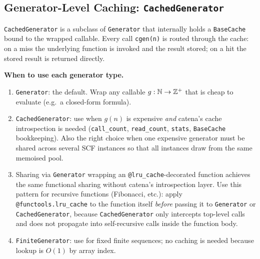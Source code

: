 \subsection{Generator-Level Caching: \texttt{CachedGenerator}}

\texttt{CachedGenerator} is a subclass of \texttt{Generator} that internally
holds a \texttt{BaseCache} bound to the wrapped callable.  Every call
\texttt{cgen(n)} is routed through the cache: on a miss the underlying function
is invoked and the result stored; on a hit the stored result is returned directly.

\textbf{When to use each generator type.}
\begin{enumerate}
  \item \texttt{Generator}: the default.  Wrap any callable $g: \mathbb{N} \to \mathbb{Z}^+$
        that is cheap to evaluate (e.g.\ a closed-form formula).
  \item \texttt{CachedGenerator}: use when $g(n)$ is expensive \emph{and}
        catena's cache introspection is needed (\texttt{call\_count},
        \texttt{read\_count}, \texttt{stats}, \texttt{BaseCache}
        bookkeeping).  Also the right choice when one expensive generator
        must be shared across several SCF instances so that all instances
        draw from the same memoised pool.
  \item Sharing via \texttt{Generator} wrapping an \texttt{@lru\_cache}-decorated
        function achieves the same functional sharing without catena's
        introspection layer.  Use this pattern for recursive functions
        (Fibonacci, etc.): apply \texttt{@functools.lru\_cache} to the function
        itself \emph{before} passing it to \texttt{Generator} or
        \texttt{CachedGenerator}, because \texttt{CachedGenerator} only
        intercepts top-level calls and does not propagate into self-recursive
        calls inside the function body.
  \item \texttt{FiniteGenerator}: use for fixed finite sequences; no caching
        is needed because lookup is $O(1)$ by array index.
\end{enumerate}

